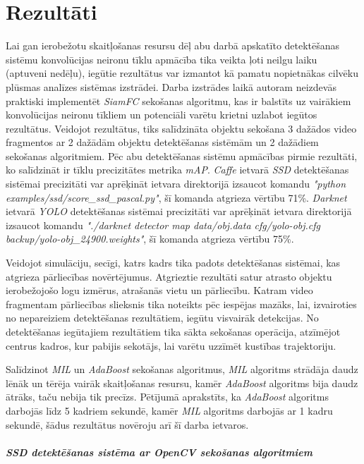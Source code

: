 \chapter{Rezultāti}

Lai gan ierobežotu skaitļošanas resursu dēļ abu darbā apskatīto detektēšanas sistēmu konvolūcijas neironu tīklu apmācība tika veikta ļoti neilgu laiku (aptuveni nedēļu), iegūtie rezultātus var izmantot kā pamatu nopietnākas cilvēku plūsmas analīzes sistēmas izstrādei. Darba izstrādes laikā autoram neizdevās praktiski implementēt \textit{SiamFC} sekošanas algoritmu, kas ir balstīts uz vairākiem konvolūcijas neironu tīkliem un potenciāli varētu krietni uzlabot iegūtos rezultātus. Veidojot rezultātus, tiks salīdzināta objektu sekošana 3 dažādos video fragmentos ar 2 dažādām objektu detektēšanas sistēmām un 2 dažādiem sekošanas algoritmiem. Pēc abu detektēšanas sistēmu apmācības pirmie rezultāti, ko salīdzināt ir tīklu precizitātes metrika \textit{mAP}. \textit{Caffe} ietvarā \textit{SSD} detektēšanas sistēmai precizitāti var aprēķināt ietvara direktorijā izsaucot komandu \textit{"python examples/ssd/score_ssd_pascal.py"}, šī komanda atgrieza vērtību 71\%. \textit{Darknet} ietvarā \textit{YOLO} detektēšanas sistēmai precizitāti var aprēķināt ietvara direktorijā izsaucot komandu\textit{ "./darknet detector map data/obj.data cfg/yolo-obj.cfg backup/yolo-obj_24900.weights"}, šī komanda atgrieza vērtību 75\%. 

Veidojot simulāciju, secīgi, katrs kadrs tika padots detektēšanas sistēmai, kas atgrieza pārliecības novērtējumus. Atgrieztie rezultāti satur atrasto objektu ierobežojošo logu izmērus, atrašanās vietu un pārliecību. Katram video fragmentam pārliecības slieksnis tika noteikts pēc iespējas mazāks, lai, izvairoties no nepareiziem detektēšanas rezultātiem, iegūtu visvairāk detekcijas. No detektēšanas iegūtajiem rezultātiem tika sākta sekošanas operācija, atzīmējot centrus kadros, kur pabijis sekotājs, lai varētu uzzīmēt kustības trajektoriju.

Salīdzinot \textit{MIL} un \textit{AdaBoost} sekošanas algoritmus, \textit{MIL} algoritms strādāja daudz lēnāk un tērēja vairāk skaitļošanas resursu, kamēr \textit{AdaBoost} algoritms bija daudz ātrāks, taču nebija tik precīzs. Pētījumā \cite{lehtola2017evaluation} aprakstīts, ka \textit{AdaBoost} algoritms darbojās līdz 5 kadriem sekundē, kamēr \textit{MIL} algoritms darbojās ar 1 kadru sekundē, šādus rezultātus novēroju arī šī darba ietvaros. 

\paragraph{\textit{SSD} detektēšanas sistēma ar \textit{OpenCV} sekošanas algoritmiem}
\hfill\par

